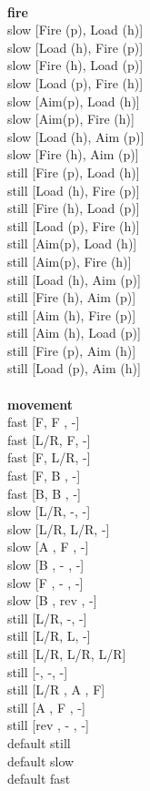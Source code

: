 \ \\ {\bf fire } \\
slow [Fire (p), Load (h)] \\
slow [Load (h), Fire (p)] \\
slow [Fire (h), Load (p)] \\
slow [Load (p), Fire (h)] \\
slow [Aim(p),  Load (h)] \\
slow [Aim(p),  Fire (h)] \\
slow [Load (h), Aim (p)] \\
slow [Fire (h), Aim (p)] \\
still [Fire (p), Load (h)] \\
still [Load (h), Fire (p)] \\
still [Fire (h), Load (p)] \\
still [Load (p), Fire (h)] \\
still [Aim(p), Load (h)] \\
still [Aim(p), Fire (h)] \\
still [Load (h), Aim (p)] \\
still [Fire (h), Aim (p)] \\
still [Aim (h), Fire (p)] \\
still [Aim (h), Load (p)] \\
still [Fire (p), Aim (h)] \\
still [Load (p), Aim (h)] \\
\ \\ {\bf movement } \\
fast [F,  F ,  -] \\
fast [L/R, F,  -] \\
fast [F, L/R,  -] \\
fast [F,  B ,  -] \\
fast [B,  B ,  -] \\
slow [L/R, -, -] \\
slow [L/R, L/R, -] \\
slow [A ,  F ,  -] \\
slow [B ,  - ,  -] \\
slow [F ,  - ,  -] \\
slow [B ,  rev ,  -] \\
still [L/R, -, -] \\
still [L/R, L, -] \\
still [L/R, L/R, L/R] \\
still [-, -, -] \\
still [L/R ,  A ,  F] \\
still [A ,  F ,  -] \\
still [rev ,  - ,  -] \\
default still \\
default slow \\
default fast \\


